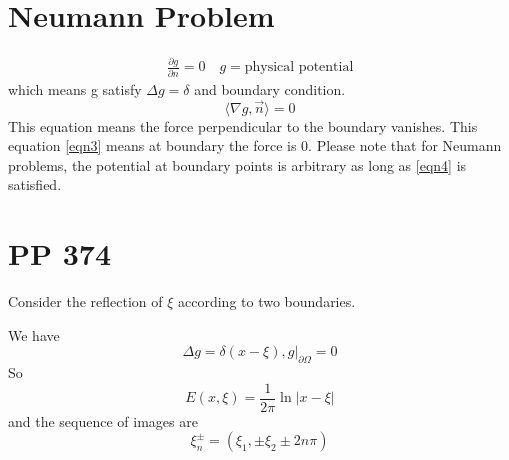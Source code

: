 \documentclass{article}
\begin{document}
\section{Neumann Problem}
\begin{align}
	\frac{\partial g}{\partial n} = 0 \quad g = \text{physical potential} \label{eqn4}
\end{align}
which means g satisfy $\Delta g = \delta$ and boundary condition.
\begin{equation}	
	\langle\nabla g, \vec{n}\rangle = 0 \label{eqn3}
\end{equation}
This equation means the force perpendicular to the boundary vanishes. This equation \eqref{eqn3} means at boundary the force is 0. Please note that for Neumann problems, the potential at boundary points is arbitrary as long as \eqref{eqn4} is satisfied.

\section{PP 374}
\begin{tcolorbox}
Consider the reflection of $\xi$ according to two boundaries.
\end{tcolorbox}
We have 
\begin{equation}
	\Delta g = \delta(x - \xi), g|_{\partial \Omega} = 0
\end{equation}
So 
\begin{equation}
	E(x,\xi) = \frac{1}{2 \pi} \ln |x- \xi|
\end{equation}
and the sequence of images are 
\begin{equation*}
	\xi_n^{\pm} = (\xi_1, \pm \xi_2 \pm 2 n \pi)
\end{equation*}
\end{document}
